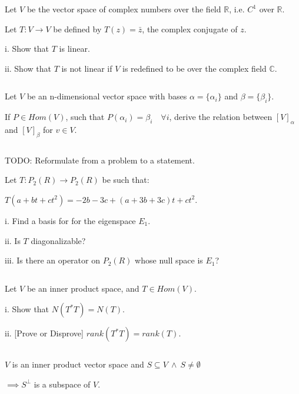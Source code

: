 \documentclass{article}
\newenvironment{customthm}[1]
  {\renewcommand\theinnercustomthm{#1}\innercustomthm}
  {\endinnercustomthm}
\begin{document}
\begin{customthm}{14}[2022.S(1.D)]
  $ $

  Let $V$ be the vector space of complex numbers over the field $\mathbb{R}$, i.e. $C^1$ over $\mathbb{R}$.

  Let $T: V \rightarrow V$ be defined by $T(z) = \bar{z}$, the complex conjugate of $z$.

  i. Show that $T$ is linear.

  ii. Show that $T$ is not linear if $V$ is redefined to be over the complex field $\mathbb{C}$.
\end{customthm}


\begin{customthm}{15}[2022.S(2.A)]
  $ $

  Let $V$ be an n-dimensional vector space with bases $\alpha = \{\alpha_i\}$ and $\beta = \{\beta_i\}$.
  
  If $P \in Hom(V)$, such that $P(\alpha_i) = \beta_i \quad \forall i$, derive the relation between $[V]_\alpha$ and $[V]_\beta$ for $v \in V$.
\end{customthm}


\begin{customthm}{16}[2022.S(2.B)]
  $ $

  TODO: Reformulate from a problem to a statement.
  \newline

  Let $T: P_2(R) \rightarrow P_2(R)$ be such that: 

  \qquad $T(a + bt + ct^2) = -2b -3c + (a+3b+3c)t + ct^2$.

  i. Find a basis for for the eigenspace $E_1$.

  ii. Is $T$ diagonalizable?

  iii. Is there an operator on $P_2(R)$ whose null space is $E_1$?
\end{customthm}



\begin{customthm}{17}[2022.S(3.B), 2021.F(3.D)]
  $ $

  Let $V$ be an inner product space, and $T \in Hom(V)$.

  i. Show that $N(T^*T)=N(T)$.

  ii. [Prove or Disprove] $rank(T^*T) = rank(T)$.
\end{customthm}


\begin{customthm}{18}[2021.F(1.A.i)]
  $ $

  $V$ is an inner product vector space and $S \subseteq V \ \land \ S \neq \emptyset$ 
  
  \noindent
  $\implies S^\perp$ is a subspace of $V$.
\end{customthm}
\end{document}
